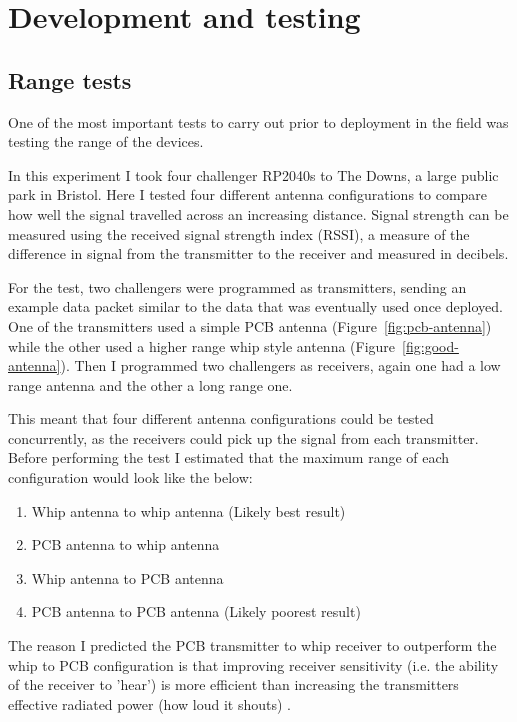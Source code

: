 \section{Development and testing}

\subsection{Range tests}

One of the most important tests to carry out prior to deployment in the field
was testing the range of the devices.

In this experiment I took four challenger RP2040s to The Downs, a large public
park in Bristol. Here I tested four different antenna configurations to compare
how well the signal travelled across an increasing distance. Signal strength can
be measured using the received signal strength index (RSSI), a measure of the
difference in signal from the transmitter to the receiver and measured in
decibels.

For the test, two challengers were programmed as transmitters, sending an
example data packet similar to the data that was eventually used once deployed.
One of the transmitters used a simple PCB antenna (Figure~\ref{fig:pcb-antenna})
while the other used a higher range whip style antenna
(Figure~\ref{fig:good-antenna}). Then I programmed two challengers as receivers,
again one had a low range antenna and the other a long range one.

This meant that four different antenna configurations could be tested
concurrently, as the receivers could pick up the signal from each transmitter.
Before performing the test I estimated that the maximum range of each
configuration would look like the below:

\begin{enumerate}
    \item Whip antenna to whip antenna (Likely best result)
    \item PCB antenna to whip antenna
    \item Whip antenna to PCB antenna
    \item PCB antenna to PCB antenna (Likely poorest result)
\end{enumerate}

The reason I predicted the PCB transmitter to whip receiver to outperform the
whip to PCB configuration is that improving receiver sensitivity (i.e. the
ability of the receiver to 'hear') is more efficient than increasing the
transmitters effective radiated power (how loud it shouts) \cite{simpulse25}.

